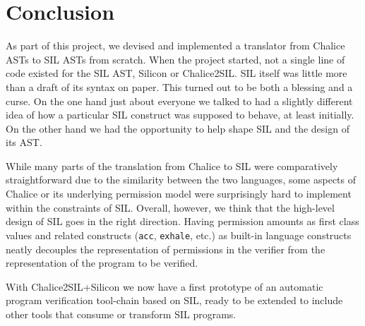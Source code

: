\section{Conclusion}\label{sct:conclusion}
As part of this project, we devised and implemented a translator from Chalice ASTs to SIL ASTs from scratch.
When the project started, not a single line of code existed for the SIL AST, Silicon or Chalice2SIL.
SIL itself was little more than a draft of its syntax on paper.
This turned out to be both a blessing and a curse.
On the one hand just about everyone we talked to had a slightly different idea of how a particular SIL construct was supposed to behave, at least initially.
On the other hand we had the opportunity to help shape SIL and the design of its AST.

While many parts of the translation from Chalice to SIL were comparatively straightforward due to the similarity between the two languages, some aspects of Chalice or its underlying permission model were surprisingly hard to implement within the constraints of SIL.
Overall, however, we think that the high-level design of SIL goes in the right direction.
Having  permission amounts as first class values and related constructs (\lstinline[language=SIL]!acc!, \lstinline[language=SIL]!exhale!, etc.) as built-in language constructs neatly decouples the representation of permissions in the verifier from the representation of the program to be verified.

With Chalice2SIL+Silicon we now have a first prototype of an automatic program verification tool-chain based on SIL, ready to be extended to include other tools that consume or transform SIL programs.
